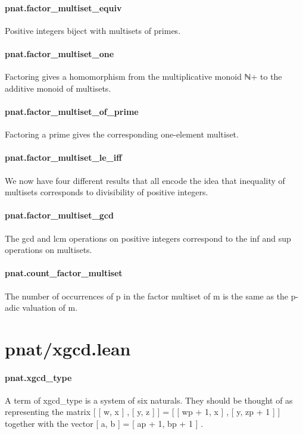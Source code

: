 \documentclass{article}
\begin{document}
\paragraph{pnat.factor\_multiset\_equiv}
\par
Positive integers biject with multisets of primes.
\paragraph{pnat.factor\_multiset\_one}
\par
Factoring gives a homomorphism from the multiplicative
monoid ℕ+ to the additive monoid of multisets.
\paragraph{pnat.factor\_multiset\_of\_prime}
\par
Factoring a prime gives the corresponding one-element multiset.
\paragraph{pnat.factor\_multiset\_le\_iff}
\par
We now have four different results that all encode the
idea that inequality of multisets corresponds to divisibility
of positive integers.
\paragraph{pnat.factor\_multiset\_gcd}
\par
The gcd and lcm operations on positive integers correspond
to the inf and sup operations on multisets.
\paragraph{pnat.count\_factor\_multiset}
\par
The number of occurrences of p in the factor multiset of m
is the same as the p-adic valuation of m.
\section{pnat/xgcd.lean}\paragraph{pnat.xgcd\_type}
\par
A term of xgcd\_type is a system of six naturals.  They should
be thought of as representing the matrix
{[}
{[}
w, x
{]}
, 
{[}
y, z
{]}
{]}
 = 
{[}
{[}
wp + 1, x
{]}
, 
{[}
y, zp + 1
{]}
{]}
together with the vector 
{[}
a, b
{]}
 = 
{[}
ap + 1, bp + 1
{]}
.
\end{document}

